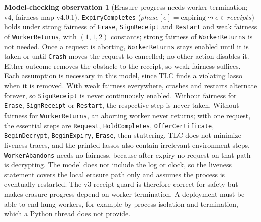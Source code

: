 \documentclass[pdflatex,sn-mathphys-num]{sn-jnl}
\theoremstyle{plain}
\theoremstyle{definition}
\newtheorem{observation}{Model-checking observation}
\newcommand{\code}[1]{\texttt{#1}}
\begin{document}
\begin{observation}[Erasure progress needs worker termination; v4, fairness map v4.0.1]\label{obs:liveness}
\code{ExpiryCompletes} ($\mathit{phase}[e]=\text{expiring}\leadsto e\in\mathit{receipts}$) holds under strong fairness of \code{Erase}, \code{SignReceipt} and \code{Restart} and weak fairness of \code{WorkerReturns}, with $(1,1,2)$ constants; strong fairness of \code{WorkerReturns} is not needed. Once a request is aborting, \code{WorkerReturns} stays enabled until it is taken or until \code{Crash} moves the request to cancelled; no other action disables it. Either outcome removes the obstacle to the receipt, so weak fairness suffices. Each assumption is necessary in this model, since TLC finds a violating lasso when it is removed. With weak fairness everywhere, crashes and restarts alternate forever, so \code{SignReceipt} is never continuously enabled. Without fairness for \code{Erase}, \code{SignReceipt} or \code{Restart}, the respective step is never taken. Without fairness for \code{WorkerReturns}, an aborting worker never returns; with one request, the essential steps are \code{Request}, \code{HoldCompletes}, \code{OfferCertificate}, \code{BeginDecrypt}, \code{BeginExpiry}, \code{Erase}, then stuttering. TLC does not minimize liveness traces, and the printed lassos also contain irrelevant environment steps. \code{WorkerAbandons} needs no fairness, because after expiry no request on that path is decrypting. The model does not include the log or clock, so the liveness statement covers the local erasure path only and assumes the process is eventually restarted. The v3 receipt guard is therefore correct for safety but makes erasure progress depend on worker termination. A deployment must be able to end hung workers, for example by process isolation and termination, which a Python thread does not provide.
\end{observation}
\end{document}
